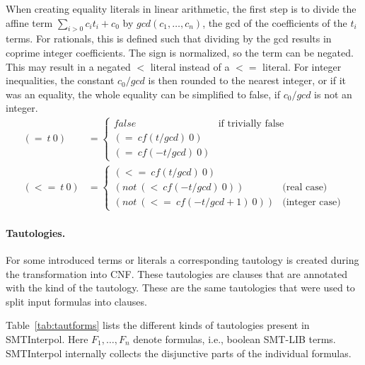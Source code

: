 \documentclass[a4paper]{article}
\newcommand\si{SMTInterpol\xspace}
\newcommand\cf{\mathit{cf}}
\begin{document}
When creating equality literals in linear arithmetic, the first step
is to divide the affine term $\sum_{i>0} c_i t_i + c_0$ by
$gcd(c_1,\dots,c_n)$, the gcd of the coefficients of the $t_i$ terms.
For rationals, this is defined such that dividing by the gcd results
in coprime integer coefficients.  The sign is normalized, so the term
can be negated.  This may result in a negated $<$ literal instead of a
$<=$ literal.  For integer inequalities, the constant $c_0/gcd$ is
then rounded to the nearest integer, or if it was an equality, the whole
equality can be simplified to false, if $c_0/gcd$ is not an integer.
\begin{align}
  (=\ t\ 0) &= \begin{cases} false & \text{if trivially false}\\
    (=\ \cf(t/gcd)\ 0) \\
    (=\ \cf(-t/gcd)\ 0)
  \end{cases}
  \tag{intern}\\
  (<=\ t\ 0) &= \begin{cases}
    (<=\ \cf(t/gcd)\ 0) \\
    (not\ (<\ \cf(-t/gcd)\ 0)) &\text{(real case)}\\
    (not\ (<=\ \cf(-t/gcd + 1)\ 0))& \text{(integer case)}
  \end{cases}
  \tag{intern}
\end{align}


\paragraph{Tautologies.}
For some introduced terms or literals a corresponding tautology is
created during the transformation into CNF.  These tautologies are
clauses that are annotated with the kind of the tautology.  These
are the same tautologies that were used to split input formulas into
clauses.

Table~\ref{tab:tautforms} lists the different kinds of tautologies present
in \si.  Here $ F_1,\dots, F_n$ denote formulas, i.e., boolean SMT-LIB terms.
\si internally collects the disjunctive parts of the individual formulas.
\end{document}
